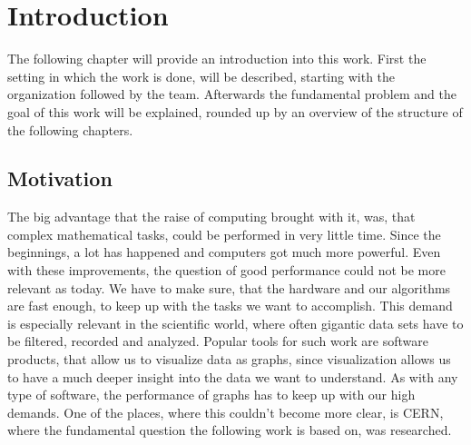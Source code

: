 
\chapter{Introduction}
\label{ch:Introduction}

The following chapter will provide an introduction into this work. First the
setting in which the work is done, will be described, starting with the
organization followed by the team. Afterwards the fundamental problem and the
goal of this work will be explained, rounded up by an overview of the
structure of the following chapters.





\section{Motivation}
\label{sec:Introduction:Motivation}

The big advantage that the raise of computing brought with it, was, that complex
mathematical tasks, could be performed in very little time. Since the
beginnings, a lot has happened and computers got much more powerful. Even with
these improvements, the question of good performance could not be more relevant
as today. We have to make sure, that the hardware and our algorithms are fast
enough, to keep up with the tasks we want to accomplish. This demand is
especially relevant in the scientific world, where often gigantic data sets have
to be filtered, recorded and analyzed. Popular tools for such work are software
products, that allow us to visualize data as graphs, since visualization allows
us to have a much deeper insight into the data we want to understand. As with
any type of software, the performance of graphs has to keep up with our high
demands. One of the places, where this couldn't become more clear, is CERN,
where the fundamental question the following work is based on, was researched.





